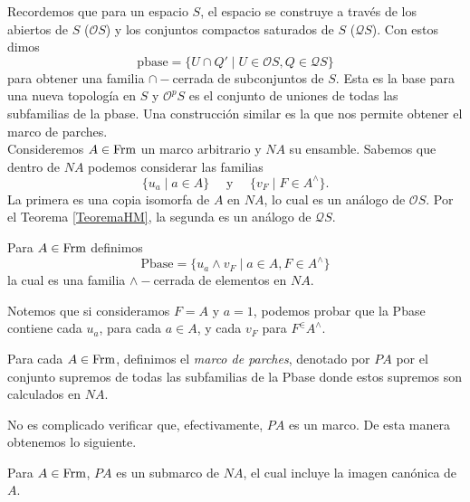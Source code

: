 Recordemos que para un espacio $S$, el espacio se construye a través de los abiertos de $S$ ($\mathcal{O}S$) y los conjuntos compactos saturados de $S$ ($\mathcal{Q}S$). Con estos dimos 
\[
\mbox{pbase}=\{U\cap Q'\mid U\in \mathcal{O}S, Q\in \mathcal{Q}S\}
\]
para obtener una familia $\cap-$cerrada de subconjuntos de $S$. Esta es la base para una nueva topología en $S$ y $\mathcal{O}^pS$ es el conjunto de uniones de todas las subfamilias de la pbase. Una construcción similar es la que nos permite obtener el marco de parches. \\

Consideremos $A\in \mathrm{Frm}$ un marco arbitrario y $NA$ su ensamble. Sabemos que dentro de $NA$ podemos considerar las familias
\[
\{u_a\mid a\in A\}\quad\mbox{ y }\quad\{v_F\mid F\in A^\wedge\}.
\]
La primera es una copia isomorfa de $A$ en $NA$, lo cual es un análogo de $\mathcal{O}S$. Por el Teorema \ref{TeoremaHM}, la segunda es un análogo de $\mathcal{Q}S$.

\begin{dfn}\label{Definición7.1.1}
    Para $A\in\mathrm{Frm}$ definimos
    \[
    \mbox{Pbase}=\{u_a\wedge v_F\mid a\in A, F\in A^\wedge\}
    \]
    la cual es una familia $\wedge-$cerrada de elementos en $NA$.
\end{dfn}

Notemos que si consideramos $F=A$ y $a=1$, podemos probar que la Pbase contiene cada $u_a$, para cada $a\in A$, y cada $v_F$ para $F^\in A^\wedge$.

\begin{dfn}\label{Definicion7.1.2}
    Para cada $A\in \mathrm{Frm}$, definimos el \emph{marco de parches}, denotado por $PA$ por el conjunto supremos de todas las subfamilias de la Pbase donde estos supremos son calculados en $NA$.
\end{dfn}

No es complicado verificar que, efectivamente, $PA$ es un marco. De esta manera obtenemos lo siguiente.

\begin{thm}\label{Teorema7.1.3}
    Para $A\in \mathrm{Frm}$, $PA$ es un submarco de $NA$, el cual incluye la imagen canónica de $A$.
\end{thm}

